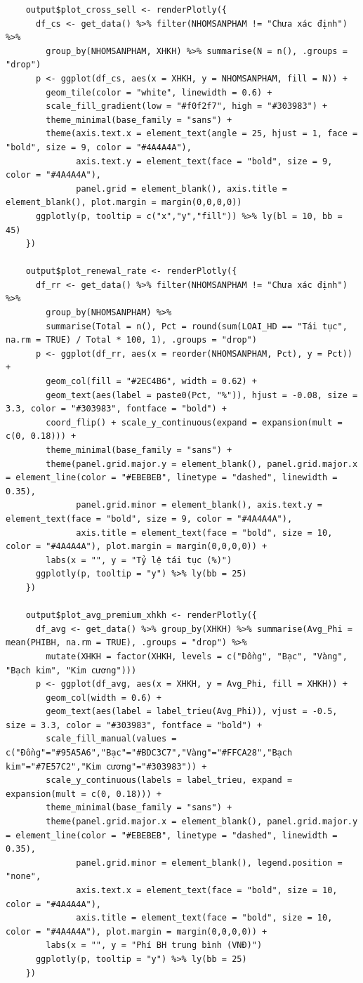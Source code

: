 \documentclass[12pt, a4paper]{article}
\begin{document}
\begin{lstlisting}
    output$plot_cross_sell <- renderPlotly({
      df_cs <- get_data() %>% filter(NHOMSANPHAM != "Chưa xác định") %>%
        group_by(NHOMSANPHAM, XHKH) %>% summarise(N = n(), .groups = "drop")
      p <- ggplot(df_cs, aes(x = XHKH, y = NHOMSANPHAM, fill = N)) +
        geom_tile(color = "white", linewidth = 0.6) +
        scale_fill_gradient(low = "#f0f2f7", high = "#303983") +
        theme_minimal(base_family = "sans") +
        theme(axis.text.x = element_text(angle = 25, hjust = 1, face = "bold", size = 9, color = "#4A4A4A"),
              axis.text.y = element_text(face = "bold", size = 9, color = "#4A4A4A"),
              panel.grid = element_blank(), axis.title = element_blank(), plot.margin = margin(0,0,0,0))
      ggplotly(p, tooltip = c("x","y","fill")) %>% ly(bl = 10, bb = 45)
    })

    output$plot_renewal_rate <- renderPlotly({
      df_rr <- get_data() %>% filter(NHOMSANPHAM != "Chưa xác định") %>%
        group_by(NHOMSANPHAM) %>%
        summarise(Total = n(), Pct = round(sum(LOAI_HD == "Tái tục", na.rm = TRUE) / Total * 100, 1), .groups = "drop")
      p <- ggplot(df_rr, aes(x = reorder(NHOMSANPHAM, Pct), y = Pct)) +
        geom_col(fill = "#2EC4B6", width = 0.62) +
        geom_text(aes(label = paste0(Pct, "%")), hjust = -0.08, size = 3.3, color = "#303983", fontface = "bold") +
        coord_flip() + scale_y_continuous(expand = expansion(mult = c(0, 0.18))) +
        theme_minimal(base_family = "sans") +
        theme(panel.grid.major.y = element_blank(), panel.grid.major.x = element_line(color = "#EBEBEB", linetype = "dashed", linewidth = 0.35),
              panel.grid.minor = element_blank(), axis.text.y = element_text(face = "bold", size = 9, color = "#4A4A4A"),
              axis.title = element_text(face = "bold", size = 10, color = "#4A4A4A"), plot.margin = margin(0,0,0,0)) +
        labs(x = "", y = "Tỷ lệ tái tục (%)")
      ggplotly(p, tooltip = "y") %>% ly(bb = 25)
    })

    output$plot_avg_premium_xhkh <- renderPlotly({
      df_avg <- get_data() %>% group_by(XHKH) %>% summarise(Avg_Phi = mean(PHIBH, na.rm = TRUE), .groups = "drop") %>%
        mutate(XHKH = factor(XHKH, levels = c("Đồng", "Bạc", "Vàng", "Bạch kim", "Kim cương")))
      p <- ggplot(df_avg, aes(x = XHKH, y = Avg_Phi, fill = XHKH)) +
        geom_col(width = 0.6) +
        geom_text(aes(label = label_trieu(Avg_Phi)), vjust = -0.5, size = 3.3, color = "#303983", fontface = "bold") +
        scale_fill_manual(values = c("Đồng"="#95A5A6","Bạc"="#BDC3C7","Vàng"="#FFCA28","Bạch kim"="#7E57C2","Kim cương"="#303983")) +
        scale_y_continuous(labels = label_trieu, expand = expansion(mult = c(0, 0.18))) +
        theme_minimal(base_family = "sans") +
        theme(panel.grid.major.x = element_blank(), panel.grid.major.y = element_line(color = "#EBEBEB", linetype = "dashed", linewidth = 0.35),
              panel.grid.minor = element_blank(), legend.position = "none",
              axis.text.x = element_text(face = "bold", size = 10, color = "#4A4A4A"),
              axis.title = element_text(face = "bold", size = 10, color = "#4A4A4A"), plot.margin = margin(0,0,0,0)) +
        labs(x = "", y = "Phí BH trung bình (VNĐ)")
      ggplotly(p, tooltip = "y") %>% ly(bb = 25)
    })


\end{lstlisting}
\end{document}
